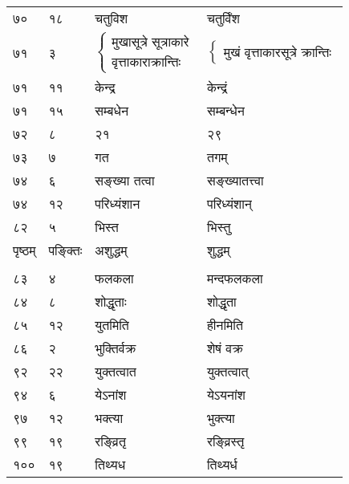 \documentclass[11pt, openany]{book}
\begin{document}
\begin{longtable}{p{1cm} p{1.5cm} p{4cm} p{4cm}}
 ७० & १८ & चतुविश & चतुर्विंश \\

 ७१ & ३ & $\begin{cases}\mbox{मुखासूत्रे सूत्राकारे} \\ \mbox{वृत्ताकाराक्रान्तिः}\end{cases}$ & $\begin{cases}\mbox{मुखं वृत्ताकारसूत्रे क्रान्तिः}\end{cases}$\\
 

 ७१ & ११ & केन्द्र & केन्द्रं\\

 ७१ & १५ & सम्बधेन & सम्बन्धेन\\

 ७२ & ८ & २१ & २९\\ 

 ७३ & ७ & गत & तगम्\\

 ७४ & ६ & सङ्ख्या तत्वा & सङ्ख्यातत्त्वा\\

 ७४ & १२ & परिध्यंशान & परिध्यंशान्\\

 ८२ & ५ & भिस्त & भिस्तु\\

\newpage



पृष्ठम् & पङ्क्तिः &  अशुद्धम् & शुद्धम्\\
\vspace{2mm}\\

 ८३ & ४ & फलकला & मन्दफलकला\\

 ८४ & ८ & शोद्धृताः & शोद्धृता \\

 ८५ & १२ & युतमिति & हीनमिति \\

 ८६ & २ & भुक्तिर्वक्र & शेषं वक्र \\

 ९२ & २२ & युक्तत्वात & युक्तत्वात् \\

 ९४ & ६ & येऽनांश & येऽयनांश \\

 ९७ & १२ & भक्त्या & भुक्त्या \\

 ९९ & १९ & रङ्व्रितृ & रङ्व्रिस्तृ\\

 १०० & १९ & तिथ्यध & तिथ्यर्ध \\


\end{longtable}
\end{document}
